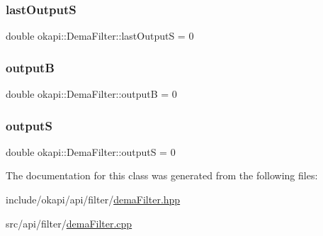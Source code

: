 \subsubsection{\texorpdfstring{lastOutputS}{lastOutputS}}
{\footnotesize\ttfamily double okapi\+::\+Dema\+Filter\+::last\+OutputS = 0\hspace{0.3cm}{\ttfamily [protected]}}

\mbox{\label{classokapi_1_1DemaFilter_a3b5321ef933fe42ad34176bbd7ee153a}} 
\subsubsection{\texorpdfstring{outputB}{outputB}}
{\footnotesize\ttfamily double okapi\+::\+Dema\+Filter\+::outputB = 0\hspace{0.3cm}{\ttfamily [protected]}}

\mbox{\label{classokapi_1_1DemaFilter_a546334c52b5e8d8f7463e5c4b5f567cc}} 
\subsubsection{\texorpdfstring{outputS}{outputS}}
{\footnotesize\ttfamily double okapi\+::\+Dema\+Filter\+::outputS = 0\hspace{0.3cm}{\ttfamily [protected]}}



The documentation for this class was generated from the following files\+:\begin{DoxyCompactItemize}
\item 
include/okapi/api/filter/\mbox{\hyperlink{demaFilter_8hpp}{dema\+Filter.\+hpp}}\item 
src/api/filter/\mbox{\hyperlink{demaFilter_8cpp}{dema\+Filter.\+cpp}}\end{DoxyCompactItemize}
